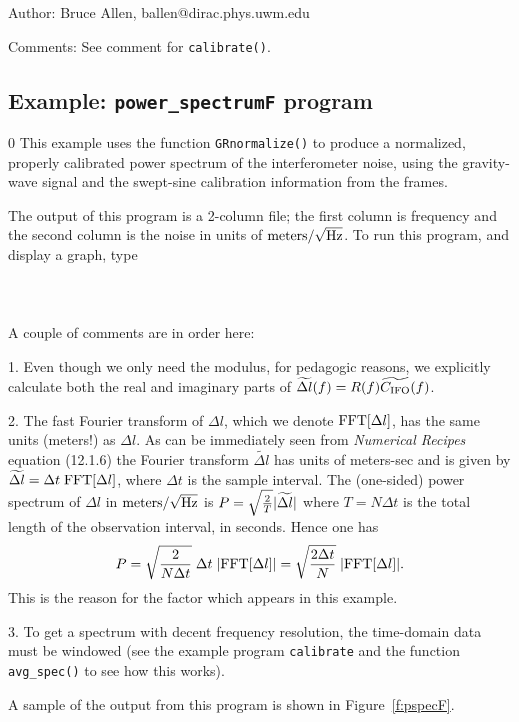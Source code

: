 \begin{description}
\item{Author:}  Bruce Allen, ballen@dirac.phys.uwm.edu
\item{Comments:}  See comment for {\tt calibrate()}.
\end{description}
\clearpage

\subsection{Example: {\tt power\_spectrumF} program}
\label{ss:power_spectrumF}
\setcounter{equation}0
This example uses the function {\tt GRnormalize()} to produce a
normalized, properly calibrated power spectrum of the interferometer
noise, using the gravity-wave signal and the swept-sine calibration information
from the frames.

The output of this program is a 2-column file; the first column is
frequency and the second column is the noise in units of $\rm
meters/\sqrt{\rm Hz}$.
To run this program, and display a graph, type\\
\\
\\
\\

\noindent
A couple of comments are in order here:
\begin{description}
\item{1.} 
Even though we only need the modulus, for pedagogic reasons, we explicitly
calculate both the real and imaginary parts of $\widetilde{\Delta l}(f)=
R(f) \widetilde{C_{\rm IFO}}(f)$.
\item{2.}
The fast Fourier transform of $\Delta l$, which we denote ${\rm
FFT}[\Delta l]$, has the same units (meters!) as $\Delta l$.  As can be
immediately seen from {\it Numerical Recipes} equation (12.1.6) the
Fourier transform $\widetilde{\Delta l}$ has units of meters-sec and is
given by $\widetilde{\Delta l} =\Delta t \; {\rm FFT}[\Delta l]$, where
$\Delta t$ is the sample interval.  The (one-sided) power spectrum of
$\Delta l$ in $\rm meters/\sqrt{\rm Hz}$ is $P=\sqrt{2 \over T}
| \widetilde{\Delta l} | $ where $T=N \Delta t$ is the total length of the
observation interval, in seconds.  Hence one has
\begin{equation}
P=\sqrt{2 \over N \Delta t} \; \Delta t \; | {\rm FFT}[\Delta l] |=
\sqrt{2 \Delta t \over N} \; | {\rm FFT}[\Delta l] |.
\end{equation}
This is the reason for the factor which appears in
this example.
\item{3.} To get a spectrum with decent frequency resolution, the time-domain
data must be windowed (see the example program {\tt calibrate} and the function
{\tt avg\_spec()} to see how this works).
\end{description}
A sample of the output from this program is shown in Figure~\ref{f:pspecF}.


